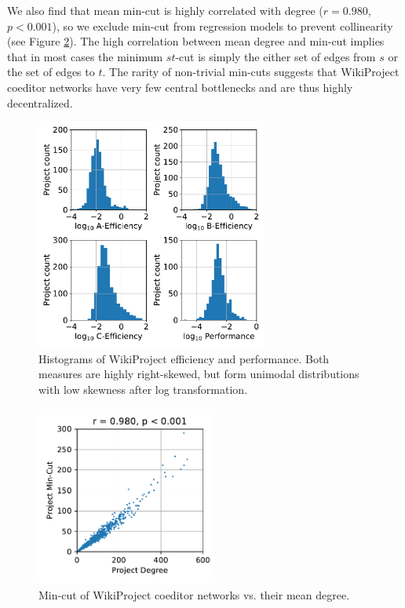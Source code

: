 We also find that mean min-cut is highly correlated with degree ($r=0.980$, $p<0.001$),
so we exclude min-cut from regression models to prevent collinearity (see Figure \ref{fig:degree-mincut}).
The high correlation between mean degree and min-cut implies that in most cases
the minimum $st$-cut is simply the either set of edges from $s$ or the set of edges to $t$.
The rarity of non-trivial min-cuts suggests that WikiProject coeditor networks have very few central
bottlenecks and are thus highly decentralized.

\begin{figure}
\centering
\includegraphics[width=3in,height=3in]{fig-eff-perf-hist.pdf}
\caption{
Histograms of WikiProject efficiency and performance.
Both measures are highly right-skewed, but form unimodal distributions
with low skewness after log transformation.
\label{fig:eff-perf-hist}
}
\end{figure}

\begin{figure}
\centering
\includegraphics[width=2.33in,height=2.33in]{fig-degree-mincut.pdf}
\caption{
Min-cut of WikiProject coeditor networks vs. their mean degree.
\label{fig:degree-mincut}
}
\end{figure}

